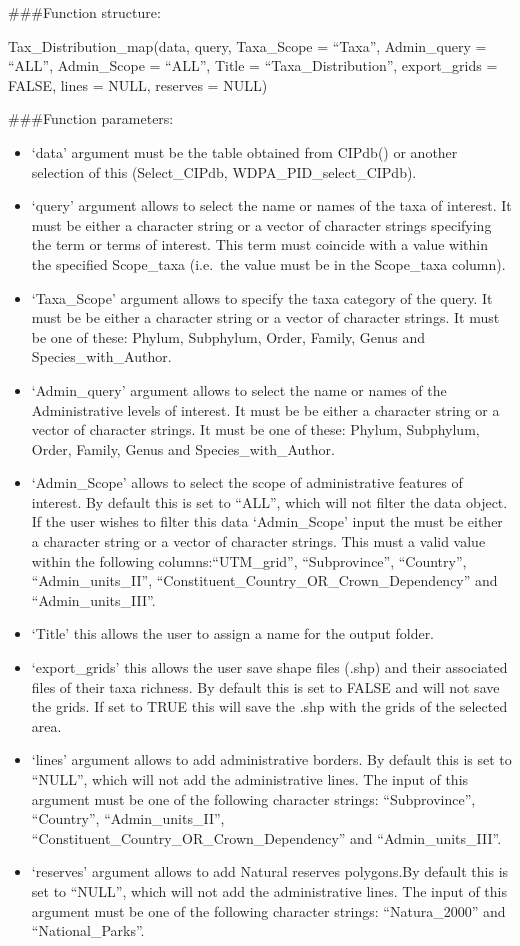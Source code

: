 \documentclass[
]{article}
\providecommand{\tightlist}{%
  \setlength{\itemsep}{0pt}\setlength{\parskip}{0pt}}
\begin{document}
\#\#\#Function structure:

Tax\_Distribution\_map(data, query, Taxa\_Scope = ``Taxa'', Admin\_query
= ``ALL'', Admin\_Scope = ``ALL'', Title = ``Taxa\_Distribution'',
export\_grids = FALSE, lines = NULL, reserves = NULL)

\#\#\#Function parameters:

\begin{itemize}
\tightlist
\item
  `data' argument must be the table obtained from CIPdb() or another
  selection of this (Select\_CIPdb, WDPA\_PID\_select\_CIPdb).
\item
  `query' argument allows to select the name or names of the taxa of
  interest. It must be either a character string or a vector of
  character strings specifying the term or terms of interest. This term
  must coincide with a value within the specified Scope\_taxa (i.e.~the
  value must be in the Scope\_taxa column).
\item
  `Taxa\_Scope' argument allows to specify the taxa category of the
  query. It must be be either a character string or a vector of
  character strings. It must be one of these: Phylum, Subphylum, Order,
  Family, Genus and Species\_with\_Author.
\item
  `Admin\_query' argument allows to select the name or names of the
  Administrative levels of interest. It must be be either a character
  string or a vector of character strings. It must be one of these:
  Phylum, Subphylum, Order, Family, Genus and Species\_with\_Author.
\item
  `Admin\_Scope' allows to select the scope of administrative features
  of interest. By default this is set to ``ALL'', which will not filter
  the data object. If the user wishes to filter this data `Admin\_Scope'
  input the must be either a character string or a vector of character
  strings. This must a valid value within the following
  columns:``UTM\_grid'', ``Subprovince'', ``Country'',
  ``Admin\_units\_II'', ``Constituent\_Country\_OR\_Crown\_Dependency''
  and ``Admin\_units\_III''.
\item
  `Title' this allows the user to assign a name for the output folder.
\item
  `export\_grids' this allows the user save shape files (.shp) and their
  associated files of their taxa richness. By default this is set to
  FALSE and will not save the grids. If set to TRUE this will save the
  .shp with the grids of the selected area.
\item
  `lines' argument allows to add administrative borders. By default this
  is set to ``NULL'', which will not add the administrative lines. The
  input of this argument must be one of the following character strings:
  ``Subprovince'', ``Country'', ``Admin\_units\_II'',
  ``Constituent\_Country\_OR\_Crown\_Dependency'' and
  ``Admin\_units\_III''.
\item
  `reserves' argument allows to add Natural reserves polygons.By default
  this is set to ``NULL'', which will not add the administrative lines.
  The input of this argument must be one of the following character
  strings: ``Natura\_2000'' and ``National\_Parks''.
\end{itemize}
\end{document}
